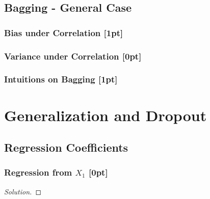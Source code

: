 \documentclass{article}
\begin{document}
	\subsection{Bagging - General Case}
	\subsubsection{Bias under Correlation [1pt]}
	\subsubsection{Variance under Correlation [0pt]}
	\subsubsection{Intuitions on Bagging [1pt]}
	
	\section{Generalization and Dropout}
	\subsection{Regression Coefficients}
	\subsubsection{Regression from $X_1$ [0pt]}
	\begin{proof}[Solution]
		
	\end{proof}
	
\end{document}
